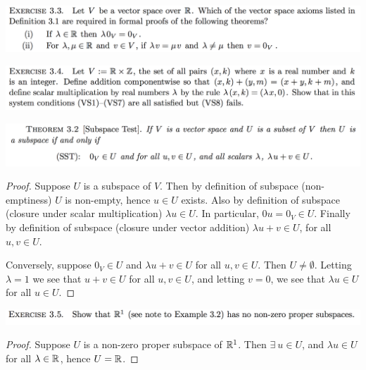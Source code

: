 \documentclass[12pt]{article}
\begin{document}
\begin{mdframed}
\includegraphics[width=400pt]{img/oxford-prelims-M1-linear-algebra-3-3.png}
\end{mdframed}

\begin{mdframed}
\includegraphics[width=400pt]{img/oxford-prelims-M1-linear-algebra-3-4.png}
\end{mdframed}

\begin{mdframed}
\includegraphics[width=400pt]{img/oxford-prelims-M1-linear-algebra-thm-3-2.png}
\end{mdframed}

\begin{proof}
  Suppose $U$ is a subspace of $V$. Then by definition of subspace
  (non-emptiness) $U$ is non-empty, hence $u \in U$ exists. Also by definition
  of subspace (closure under scalar multiplication) $\lambda u \in U$. In
  particular, $0u = 0_V \in U$. Finally by definition of subspace (closure
  under vector addition) $\lambda u + v \in U$, for all $u, v \in U$.

  Conversely, suppose $0_V \in U$ and $\lambda u + v \in U$ for all
  $u, v \in U$. Then $U \neq \emptyset$. Letting $\lambda = 1$ we see that
  $u + v \in U$ for all $u, v \in U$, and letting $v = 0$, we see that
  $\lambda u \in U$ for all $u \in U$.
\end{proof}

\begin{mdframed}
\includegraphics[width=400pt]{img/oxford-prelims-M1-linear-algebra-3-5.png}
\end{mdframed}

\begin{proof}
  Suppose $U$ is a non-zero proper subspace of $\mathbb{R}^1$. Then
  $\exists ~ u \in U$, and $\lambda u \in U$ for all $\lambda \in \mathbb{R}$, hence
  $U = \mathbb{R}$.
\end{proof}
\end{document}
